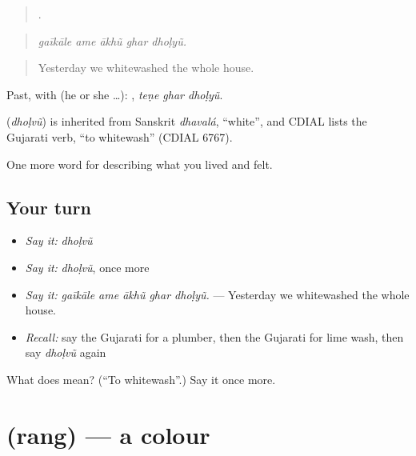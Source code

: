 \begin{quote}
    .
\end{quote}

\begin{quote}
\emph{gaīkāle ame ākhũ ghar dhoḷyũ.}
\end{quote}

\begin{quote}
Yesterday we whitewashed the whole house.
\end{quote}

Past, with  (he or she …):   , \emph{teṇe ghar dhoḷyũ}.

\begin{cousinweb}
\textbf{} (\emph{dhoḷvũ}) is inherited from Sanskrit \emph{dhavalá}, \textquotedblleft{}white\textquotedblright{}, and CDIAL lists the Gujarati verb, \textquotedblleft{}to whitewash\textquotedblright{} (CDIAL 6767).
\end{cousinweb}

\begin{grammarlens}[title={What you've built}]
One more word for describing what you lived and felt.
\end{grammarlens}

\subsection*{Your turn}
\begin{itemize}
\raggedright
  \item \emph{Say it:} \emph{dhoḷvũ}
  \item \emph{Say it:} \emph{dhoḷvũ}, once more
  \item \emph{Say it:} \emph{gaīkāle ame ākhũ ghar dhoḷyũ.} — Yesterday we whitewashed the whole house.
  \item \emph{Recall:} say the Gujarati for a plumber, then the Gujarati for lime wash, then say \emph{dhoḷvũ} again
\end{itemize}

\begin{tcolorbox}[breakable,colback=teal!4,colframe=teal!35!black,title={Before you move on}]
What does  mean? (\textquotedblleft{}To whitewash\textquotedblright{}.) Say it once more.
\end{tcolorbox}
\section[\texorpdfstring{\gu{રંગ} (rang)}{રંગ (rang)}]{ (rang) — a colour}

